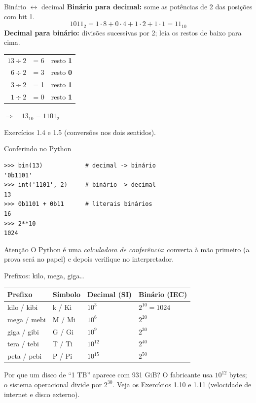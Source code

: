 \documentclass[aspectratio=169,10pt,t]{beamer}
\begin{document}
\begin{frame}{Binário \(\leftrightarrow\) decimal}
  \textbf{Binário para decimal:} some as potências de 2 das posições com bit 1.
  \[ 1011_2 = 1\cdot 8 + 0\cdot 4 + 1\cdot 2 + 1\cdot 1 = 11_{10} \]
  \textbf{Decimal para binário:} divisões sucessivas por 2; leia os restos de baixo para cima.
  \begin{center}\small
    \begin{tabular}{rcl}
      \(13 \div 2\) & = 6 & resto \textbf{1}\\
      \(6 \div 2\)  & = 3 & resto \textbf{0}\\
      \(3 \div 2\)  & = 1 & resto \textbf{1}\\
      \(1 \div 2\)  & = 0 & resto \textbf{1}
    \end{tabular}
    \quad \(\Rightarrow\quad 13_{10} = 1101_2\)
  \end{center}
  \footnotesize Exercícios 1.4 e 1.5 (conversões nos dois sentidos).
\end{frame}

\begin{frame}[fragile]{Conferindo no Python}
\begin{lstlisting}
>>> bin(13)            # decimal -> binário
'0b1101'
>>> int('1101', 2)     # binário -> decimal
13
>>> 0b1101 + 0b11      # literais binários
16
>>> 2**10
1024
\end{lstlisting}
  \begin{alertblock}{Atenção}
    O Python é uma \emph{calculadora de conferência}: converta à mão primeiro (a prova será no papel) e depois verifique no interpretador.
  \end{alertblock}
\end{frame}

\begin{frame}{Prefixos: kilo, mega, giga\ldots}
  \centering
  \begin{tabular}{llll}
    \toprule
    Prefixo & Símbolo & Decimal (SI) & Binário (IEC)\\
    \midrule
    kilo / kibi & k / Ki & \(10^3\) & \(2^{10}=1024\)\\
    mega / mebi & M / Mi & \(10^6\) & \(2^{20}\)\\
    giga / gibi & G / Gi & \(10^9\) & \(2^{30}\)\\
    tera / tebi & T / Ti & \(10^{12}\) & \(2^{40}\)\\
    peta / pebi & P / Pi & \(10^{15}\) & \(2^{50}\)\\
    \bottomrule
  \end{tabular}
  \vspace{1.5ex}

  \begin{block}{Por que um disco de ``1 TB'' aparece com 931 GiB?}
    O fabricante usa \(10^{12}\) bytes; o sistema operacional divide por \(2^{30}\). Veja os Exercícios 1.10 e 1.11 (velocidade de internet e disco externo).
  \end{block}
\end{frame}
\end{document}

